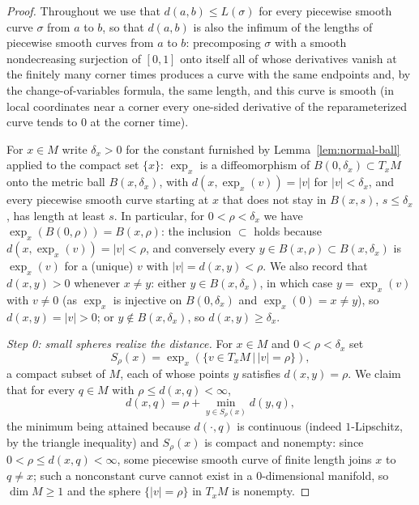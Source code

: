 \begin{proof}
Throughout we use that $d(a,b)\le L(\sigma)$ for every piecewise
smooth curve $\sigma$ from $a$ to $b$, so that $d(a,b)$ is also the
infimum of the lengths of piecewise smooth curves from $a$ to $b$:
precomposing $\sigma$ with a smooth nondecreasing surjection of
$[0,1]$ onto itself all of whose derivatives vanish at the finitely
many corner times produces a curve with the same endpoints and, by
the change-of-variables formula, the same length, and this curve is
smooth (in local coordinates near a corner every one-sided
derivative of the reparameterized curve tends to $0$ at the corner
time).

For $x\in M$ write $\delta_x>0$ for the constant furnished by
Lemma~\ref{lem:normal-ball} applied to the compact set $\{x\}$:
$\exp_x$ is a diffeomorphism of $B(0,\delta_x)\subset T_xM$ onto
the metric ball $B(x,\delta_x)$, with $d(x,\exp_x(v))=|v|$ for
$|v|<\delta_x$, and every piecewise smooth curve starting at $x$
that does not stay in $B(x,s)$, $s\le\delta_x$, has length at least
$s$. In particular, for $0<\rho<\delta_x$ we have
$\exp_x(B(0,\rho))=B(x,\rho)$: the inclusion $\subset$ holds
because $d(x,\exp_x(v))=|v|<\rho$, and conversely every $y\in
B(x,\rho)\subset B(x,\delta_x)$ is $\exp_x(v)$ for a (unique) $v$
with $|v|=d(x,y)<\rho$. We also record that $d(x,y)>0$ whenever
$x\not=y$: either $y\in B(x,\delta_x)$, in which case
$y=\exp_x(v)$ with $v\not=0$ (as $\exp_x$ is injective on
$B(0,\delta_x)$ and $\exp_x(0)=x\not=y$), so $d(x,y)=|v|>0$; or
$y\notin B(x,\delta_x)$, so $d(x,y)\ge\delta_x$.

\emph{Step 0: small spheres realize the distance.} For $x\in M$
and $0<\rho<\delta_x$ set
$$S_\rho(x)=\exp_x\left(\{v\in T_xM\,|\,|v|=\rho\}\right),$$
a compact subset of $M$, each of whose points $y$ satisfies
$d(x,y)=\rho$. We claim that for every $q\in M$ with
$\rho\le d(x,q)<\infty$,
$$d(x,q)=\rho+\min_{y\in S_\rho(x)}d(y,q),$$
the minimum being attained because $d(\cdot,q)$ is continuous
(indeed $1$-Lipschitz, by the triangle inequality) and $S_\rho(x)$
is compact and nonempty: since $0<\rho\le d(x,q)<\infty$, some
piecewise smooth curve of finite length joins $x$ to $q\not=x$;
such a nonconstant curve cannot exist in a $0$-dimensional
manifold, so $\dim M\ge1$ and the sphere $\{|v|=\rho\}$ in $T_xM$
is nonempty.


\end{proof}
